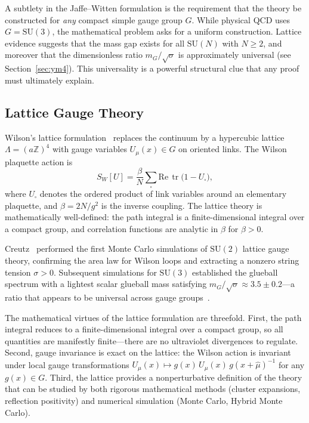 \documentclass[11pt]{article}
\DeclareMathOperator{\tr}{tr}
\begin{document}
A subtlety in the Jaffe--Witten formulation is the requirement that the
theory be constructed for \emph{any} compact simple gauge group $G$.
While physical QCD uses $G = \mathrm{SU}(3)$, the mathematical problem
asks for a uniform construction.  Lattice evidence suggests that the
mass gap exists for all $\mathrm{SU}(N)$ with $N \geq 2$, and moreover
that the dimensionless ratio $m_G/\sqrt{\sigma}$ is approximately
universal (see Section~\ref{sec:ym4}).  This universality is a powerful
structural clue that any proof must ultimately explain.

\subsection{Lattice Gauge Theory}

Wilson's lattice formulation~\cite{Wilson} replaces the continuum by a
hypercubic lattice $\Lambda = (a\mathbb{Z})^4$ with gauge variables
$U_\mu(x) \in G$ on oriented links.  The Wilson plaquette action is
\begin{equation}\label{eq:wilson-action}
  S_W[U] = \frac{\beta}{N} \sum_{\square}
  \mathrm{Re}\,\tr\bigl(1 - U_\square\bigr),
\end{equation}
where $U_\square$ denotes the ordered product of link variables around
an elementary plaquette, and $\beta = 2N/g^2$ is the inverse coupling.
The lattice theory is mathematically well-defined: the path integral is
a finite-dimensional integral over a compact group, and correlation
functions are analytic in $\beta$ for $\beta > 0$.

Creutz~\cite{Creutz} performed the first Monte Carlo simulations of
$\mathrm{SU}(2)$ lattice gauge theory, confirming the area law for
Wilson loops and extracting a nonzero string tension $\sigma > 0$.
Subsequent simulations for $\mathrm{SU}(3)$ established the glueball
spectrum with a lightest scalar glueball mass satisfying
$m_G / \sqrt{\sigma} \approx 3.5 \pm 0.2$---a ratio that appears to
be universal across gauge groups~\cite{Teper,LM}.

The mathematical virtues of the lattice formulation are threefold.
First, the path integral reduces to a finite-dimensional integral
over a compact group, so all quantities are manifestly finite---there
are no ultraviolet divergences to regulate.  Second, gauge invariance
is exact on the lattice: the Wilson action is invariant under local
gauge transformations $U_\mu(x) \mapsto g(x)\,U_\mu(x)\,g(x+\hat\mu)^{-1}$
for any $g(x) \in G$.  Third, the lattice provides a nonperturbative
definition of the theory that can be studied by both rigorous mathematical
methods (cluster expansions, reflection positivity) and numerical
simulation (Monte Carlo, Hybrid Monte Carlo).
\end{document}
